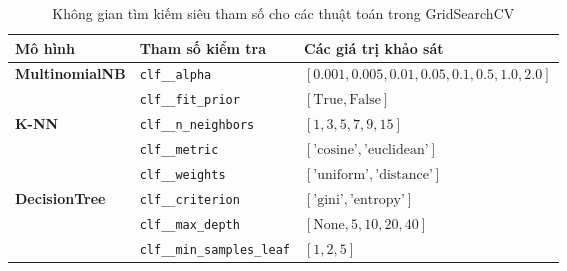 \begin{table}[H]
\centering
\caption{Không gian tìm kiếm siêu tham số cho các thuật toán trong GridSearchCV}
\label{tab:khong-gian-sieu-tham-so}
\begin{tabular}{|l|l|p{7.5cm}|}
\hline
\textbf{Mô hình} & \textbf{Tham số kiểm tra} & \textbf{Các giá trị khảo sát} \\
\hline
\multirow{2}{*}{\textbf{MultinomialNB}} & \texttt{clf\_\_alpha} & $[0.001, 0.005, 0.01, 0.05, 0.1, 0.5, 1.0, 2.0]$ \\
\cline{2-3}
& \texttt{clf\_\_fit\_prior} & $[\text{True}, \text{False}]$ \\
\hline
\multirow{3}{*}{\textbf{K-NN}} & \texttt{clf\_\_n\_neighbors} & $[1, 3, 5, 7, 9, 15]$ \\
\cline{2-3}
& \texttt{clf\_\_metric} & $[\text{'cosine'}, \text{'euclidean'}]$ \\
\cline{2-3}
& \texttt{clf\_\_weights} & $[\text{'uniform'}, \text{'distance'}]$ \\
\hline
\multirow{3}{*}{\textbf{DecisionTree}} & \texttt{clf\_\_criterion} & $[\text{'gini'}, \text{'entropy'}]$ \\
\cline{2-3}
& \texttt{clf\_\_max\_depth} & $[\text{None}, 5, 10, 20, 40]$ \\
\cline{2-3}
& \texttt{clf\_\_min\_samples\_leaf} & $[1, 2, 5]$ \\
\hline
\end{tabular}
\end{table}

